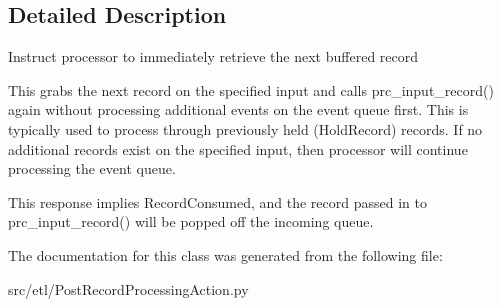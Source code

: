 \subsection{Detailed Description}
\begin{DoxyVerb}Instruct processor to immediately retrieve the next buffered record

This grabs the next record on the specified input and calls
prc_input_record() again without processing additional events on the event
queue first.  This is typically used to process through previously held
(HoldRecord) records.  If no additional records exist on the specified
input, then processor will continue processing the event queue.

This response implies RecordConsumed, and the record passed in to
prc_input_record() will be popped off the incoming queue.
\end{DoxyVerb}
 

The documentation for this class was generated from the following file\-:\begin{DoxyCompactItemize}
\item 
src/etl/Post\-Record\-Processing\-Action.\-py\end{DoxyCompactItemize}
